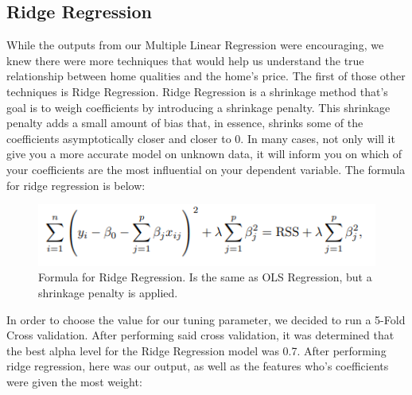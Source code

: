 \documentclass{article}
\begin{document}
	\subsection{Ridge Regression}

	While the outputs from our Multiple Linear Regression were encouraging, we knew there were more techniques that would help us understand the true relationship between home qualities and the home's price. The first of those other techniques is Ridge Regression.
	Ridge Regression is a shrinkage method that's goal is to weigh coefficients by introducing a shrinkage penalty. This shrinkage penalty adds a small amount of bias that, in essence, shrinks some of the coefficients asymptotically closer and closer to 0. In many cases, not only will it give you a more accurate model on unknown data, it will inform you on which of your coefficients are the most influential on your dependent variable. The formula for ridge regression is below:

	\begin{figure}[H]
		\includegraphics[width=\textwidth]{ridgeform}
		\caption{Formula for Ridge Regression. Is the same as OLS Regression, but a shrinkage penalty is applied.}
		\label{fig:skew}
	\end{figure}

	In order to choose the value for our tuning parameter, we decided to run a 5-Fold Cross validation. After performing said cross validation, it was determined that the best alpha level for the Ridge Regression model was 0.7. After performing ridge regression, here was our output, as well as the features who's coefficients were given the most weight:

\end{document}
